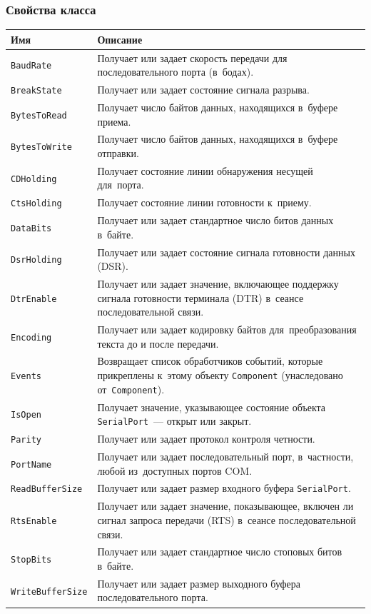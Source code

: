 \documentclass[a4paper,12pt]{article}
\begin{document}
\subsubsection*{Свойства класса}
\begin{center}
\begin{longtabu} to \linewidth {|X|X[2.7]|}
\hline
\textbf{Имя}	&	\textbf{Описание}\\\hline\endhead
\texttt{BaudRate}	&	Получает или задает скорость передачи для последовательного порта (в~бодах).\\\hline
\texttt{BreakState}	&	Получает или задает состояние сигнала разрыва.\\\hline
\texttt{BytesToRead}	&	Получает число байтов данных, находящихся в~буфере приема.\\\hline
\texttt{BytesToWrite}	&	Получает число байтов данных, находящихся в~буфере отправки.\\\hline
\texttt{CDHolding}	&	Получает состояние линии обнаружения несущей для~порта.\\\hline
\texttt{CtsHolding}	&	Получает состояние линии готовности к~приему.\\\hline
\texttt{DataBits}	&	Получает или задает стандартное число битов данных в~байте.\\\hline
\texttt{DsrHolding}	&	Получает или задает состояние сигнала готовности данных (DSR).\\\hline
\texttt{DtrEnable}	&	Получает или задает значение, включающее поддержку сигнала готовности терминала (DTR) в~сеансе последовательной связи.\\\hline
\texttt{Encoding}	&	Получает или задает кодировку байтов для~преобразования текста до и после передачи.\\\hline
\texttt{Events}	&	Возвращает список обработчиков событий, которые прикреплены к~этому объекту \texttt{Component} (унаследовано от~\texttt{Component}).\\\hline
\texttt{IsOpen}	&	Получает значение, указывающее состояние объекта \texttt{SerialPort}~--- открыт или закрыт.\\\hline
\texttt{Parity}	&	Получает или задает протокол контроля четности.\\\hline
\texttt{PortName}	&	Получает или задает последовательный порт, в~частности, любой из~доступных портов COM.\\\hline
\texttt{ReadBufferSize}	&	Получает или задает размер входного буфера \texttt{SerialPort}.\\\hline
\texttt{RtsEnable}	&	Получает или задает значение, показывающее, включен ли сигнал запроса передачи (RTS) в~сеансе последовательной связи.\\\hline
\texttt{StopBits}	&	Получает или задает стандартное число стоповых битов в~байте.\\\hline
\texttt{WriteBufferSize}	&	Получает или задает размер выходного буфера последовательного порта. \\\hline
\end{longtabu}
\end{center}
\end{document}
